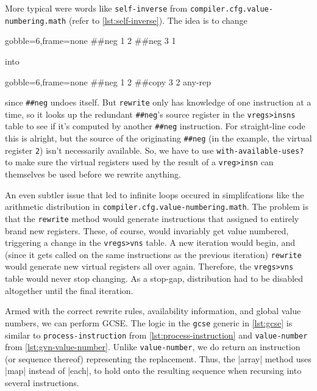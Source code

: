 More typical were words like \Verb|self-inverse| from
\Verb|compiler.cfg.value-numbering.math| (refer to \vref{lst:self-inverse}).
The idea is to change
%
\begin{center}
  \begin{minipage}{0.2\linewidth}
    \begin{factorcode*}{gobble=6,frame=none}
      ##neg 1 2
      ##neg 3 1
    \end{factorcode*}
  \end{minipage}
\end{center}
%
\noindent into
%
\begin{center}
  \begin{minipage}{0.2\linewidth}
    \begin{factorcode*}{gobble=6,frame=none}
      ##neg 1 2
      ##copy 3 2 any-rep
    \end{factorcode*}
  \end{minipage}
\end{center}
%
\noindent since \Verb|##neg| undoes itself.  But \Verb|rewrite| only has
knowledge of one instruction at a time, so it looks up the redundant
\Verb|##neg|'s source register in the \Verb|vregs>insns| table to see if
it's computed by another \Verb|##neg| instruction.  For straight-line code this
is alright, but the source of the originating \Verb|##neg| (in the example, the
virtual register \Verb|2|) isn't necessarily available.  So, we have to use
\Verb|with-available-uses?| to make sure the virtual registers used by the
result of a \Verb|vreg>insn| can themselves be used before we rewrite
anything.

An even subtler issue that led to infinite loops occured in simplifcations like
the arithmetic distribution in \Verb|compiler.cfg.value-numbering.math|.  The
problem is that the \Verb|rewrite| method would generate instructions that
assigned to entirely brand new registers.  These, of course, would invariably
get value numbered, triggering a change in the \Verb|vregs>vns| table.  A new
iteration would begin, and (since it gets called on the same instructions as
the previous iteration) \Verb|rewrite| would generate new virtual registers
all over again.  Therefore, the \Verb|vregs>vns| table would never stop
changing.  As a stop-gap, distribution had to be disabled altogether until the
final iteration.


Armed with the correct rewrite rules, availability information, and global
value numbers, we can perform \gls{GCSE}.  The logic in the \Verb|gcse|
generic in \vref{lst:gcse} is similar to \Verb|process-instruction| from
\cref{lst:process-instruction} and \Verb|value-number| from
\vref{lst:gvn-value-number}.  Unlike \Verb|value-number|, we do return an
instruction (or sequence thereof) representing the replacement.  Thus, the
\factor|array| method uses \factor|map| instead of \factor|each|, to hold onto
the resulting sequence when recursing into several instructions.

